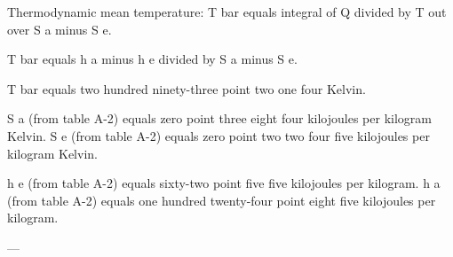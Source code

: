Thermodynamic mean temperature:  
T bar equals integral of Q divided by T out over S a minus S e.  

T bar equals h a minus h e divided by S a minus S e.  

T bar equals two hundred ninety-three point two one four Kelvin.  

S a (from table A-2) equals zero point three eight four kilojoules per kilogram Kelvin.  
S e (from table A-2) equals zero point two two four five kilojoules per kilogram Kelvin.  

h e (from table A-2) equals sixty-two point five five kilojoules per kilogram.  
h a (from table A-2) equals one hundred twenty-four point eight five kilojoules per kilogram.  

---
